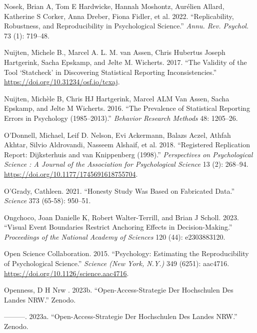 \documentclass[
  letterpaper,
  DIV=11,
  numbers=noendperiod]{scrreprt}
\newlength{\cslhangindent}
\newenvironment{CSLReferences}[2] %
 {\begin{list}{}{%
  \setlength{\itemindent}{0pt}
  \setlength{\leftmargin}{0pt}
  \setlength{\parsep}{0pt}
  \ifodd #1
   \setlength{\leftmargin}{\cslhangindent}
   \setlength{\itemindent}{-1\cslhangindent}
  \fi
  \setlength{\itemsep}{#2\baselineskip}}}
 {\end{list}}
\begin{document}
\begin{CSLReferences}{1}{0}
Nosek, Brian A, Tom E Hardwicke, Hannah Moshontz, Aurélien Allard,
Katherine S Corker, Anna Dreber, Fiona Fidler, et al. 2022.
{``Replicability, Robustness, and Reproducibility in Psychological
Science.''} \emph{Annu. Rev. Psychol.} 73 (1): 719--48.

Nuijten, Michele B., Marcel A. L. M. van Assen, Chris Hubertus Joseph
Hartgerink, Sacha Epskamp, and Jelte M. Wicherts. 2017. {``The Validity
of the Tool {`Statcheck'} in Discovering Statistical Reporting
Inconsistencies.''} \url{https://doi.org/10.31234/osf.io/tcxaj}.

Nuijten, Michèle B, Chris HJ Hartgerink, Marcel ALM Van Assen, Sacha
Epskamp, and Jelte M Wicherts. 2016. {``The Prevalence of Statistical
Reporting Errors in Psychology (1985--2013).''} \emph{Behavior Research
Methods} 48: 1205--26.

O'Donnell, Michael, Leif D. Nelson, Evi Ackermann, Balazs Aczel, Athfah
Akhtar, Silvio Aldrovandi, Nasseem Alshaif, et al. 2018. {``Registered
Replication Report: Dijksterhuis and van Knippenberg (1998).''}
\emph{Perspectives on Psychological Science : A Journal of the
Association for Psychological Science} 13 (2): 268--94.
\url{https://doi.org/10.1177/1745691618755704}.

O'Grady, Cathleen. 2021. {``Honesty Study Was Based on Fabricated
Data.''} \emph{Science} 373 (65-58): 950--51.

Ongchoco, Joan Danielle K, Robert Walter-Terrill, and Brian J Scholl.
2023. {``Visual Event Boundaries Restrict Anchoring Effects in
Decision-Making.''} \emph{Proceedings of the National Academy of
Sciences} 120 (44): e2303883120.

Open Science Collaboration. 2015. {``Psychology: Estimating the
Reproducibility of Psychological Science.''} \emph{Science (New York,
N.Y.)} 349 (6251): aac4716.
\url{https://doi.org/10.1126/science.aac4716}.

Openness, D H Nrw \textbar. 2023b. {``{Open-Access-Strategie} Der
Hochschulen Des Landes {NRW}.''} Zenodo.

---------. 2023a. {``{Open-Access-Strategie} Der Hochschulen Des Landes
{NRW}.''} Zenodo.


\end{CSLReferences}
\end{document}
